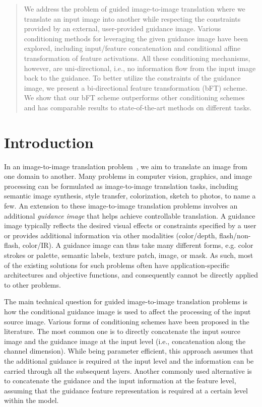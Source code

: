 \documentclass[10pt,twocolumn,letterpaper]{article}
\newlength\secmargin
\begin{document}
\begin{abstract}
\vspace{-3mm}
We address the problem of guided image-to-image translation where we translate an input image into another while respecting the constraints provided by an external, user-provided guidance image.
Various conditioning methods for leveraging the given guidance image have been explored, including input/feature concatenation and conditional affine transformation of feature activations.
All these conditioning mechanisms, however, are uni-directional, i.e., no information flow from the input image back to the guidance.
To better utilize the constraints of the guidance image, we present a bi-directional feature transformation (bFT) scheme.
We show that our bFT scheme outperforms other conditioning schemes and has comparable results to state-of-the-art methods on different tasks.
\end{abstract}
 
\vspace{\secmargin}
\section{Introduction}
\label{sec:intro}

In an image-to-image translation problem~\cite{isola2017image}, we aim to translate an image from one domain to another. Many problems in computer vision, graphics, and image processing can be formulated as image-to-image translation tasks, including semantic image synthesis, style transfer, colorization, sketch to photos, to name a few. 
An extension to these image-to-image translation problems involves an additional \emph{guidance image} that helps achieve controllable translation. 
A guidance image typically reflects the desired visual effects or constraints specified by a user or provides additional information via other modalities (color/depth, flash/non-flash, color/IR). A guidance image can thus take many different forms, e.g. color strokes or palette, semantic labels, texture patch, image, or mask. As such, most of the existing solutions for such problems often have application-specific architectures and objective functions, and consequently cannot be directly applied to other problems.

The main technical question for guided image-to-image translation problems is how the conditional guidance image is used to affect the processing of the input source image. 
Various forms of conditioning schemes have been proposed in the literature. 
The most common one is to directly concatenate the input source image and the guidance image at the input level (i.e., concatenation along the channel dimension). While being parameter efficient, this approach assumes that the additional guidance is required at the input level and the information can be carried through all the subsequent layers. Another commonly used  alternative is to concatenate the guidance and the input information at the feature level, assuming that the guidance feature representation is required at a certain level within the model.
\end{document}
